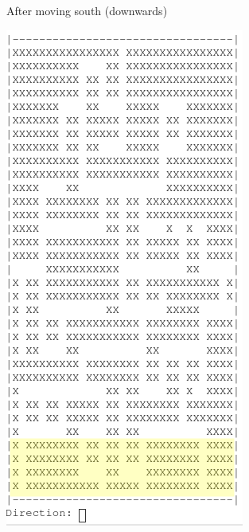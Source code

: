 \documentclass[../Main.tex]{subfiles}
\begin{document}
\begin{multicols*}{3}
            \columnbreak
            After moving south (downwards) \par
            \centerline{\includegraphics[width=0.75\linewidth]{img/Design/Output2.png}}



\end{multicols*}
\end{document}
